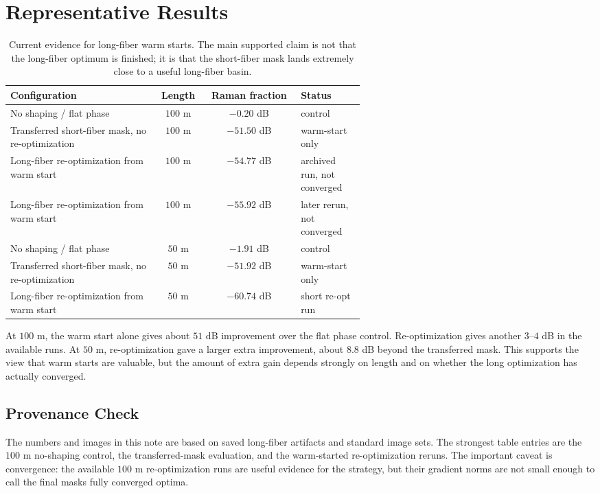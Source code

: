 \documentclass[11pt]{article}
\begin{document}
\section{Representative Results}

\begin{table}[H]
\centering
\small
\begin{tabular}{>{\raggedright\arraybackslash}p{0.42\linewidth}cc>{\raggedright\arraybackslash}p{0.18\linewidth}}
\toprule
Configuration & Length & Raman fraction & Status \\
\midrule
No shaping / flat phase & $100$ m & $-0.20$ dB & control \\
Transferred short-fiber mask, no re-optimization & $100$ m & $-51.50$ dB & warm-start only \\
Long-fiber re-optimization from warm start & $100$ m & $-54.77$ dB & archived run, not converged \\
Long-fiber re-optimization from warm start & $100$ m & $-55.92$ dB & later rerun, not converged \\
\midrule
No shaping / flat phase & $50$ m & $-1.91$ dB & control \\
Transferred short-fiber mask, no re-optimization & $50$ m & $-51.92$ dB & warm-start only \\
Long-fiber re-optimization from warm start & $50$ m & $-60.74$ dB & short re-opt run \\
\bottomrule
\end{tabular}
\caption{Current evidence for long-fiber warm starts.  The main supported claim
is not that the long-fiber optimum is finished; it is that the short-fiber mask
lands extremely close to a useful long-fiber basin.}
\label{tab:results}
\end{table}

At $100$ m, the warm start alone gives about $51$ dB improvement over the flat
phase control.  Re-optimization gives another $3$--$4$ dB in the available
runs.  At $50$ m, re-optimization gave a larger extra improvement, about
$8.8$ dB beyond the transferred mask.  This supports the view that warm starts
are valuable, but the amount of extra gain depends strongly on length and on
whether the long optimization has actually converged.

\subsection*{Provenance Check}

The numbers and images in this note are based on saved long-fiber artifacts and
standard image sets.  The strongest table entries are the $100$ m no-shaping
control, the transferred-mask evaluation, and the warm-started re-optimization
reruns.  The important caveat is convergence: the available $100$ m
re-optimization runs are useful evidence for the strategy, but their gradient
norms are not small enough to call the final masks fully converged optima.
\end{document}
